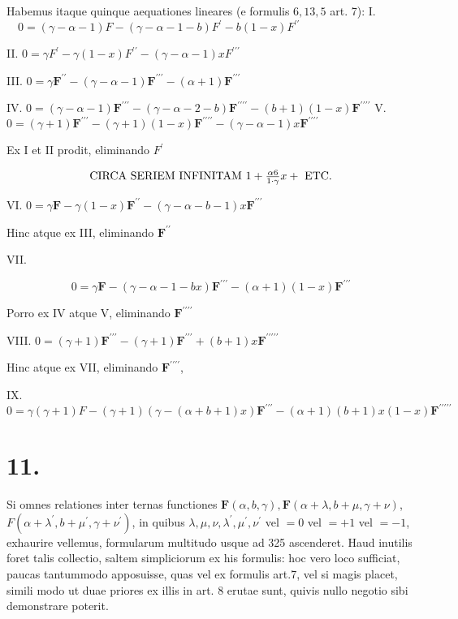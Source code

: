 \documentclass[twoside,12pt, showframe]{memoir}
\let\oldfrac\frac
\def\frac#1#2{\mathchoice{\tfrac{#1}{#2}}{\oldfrac{#1}{#2}}{\genfrac{}{}{}{2}{#1}{#2\mathstrut}}{\genfrac{}{}{}{3}{#1}{#2\mathstrut}}}
\begin{document}
Habemus itaque quinque aequationes lineares (e formulis \(6,13,5\) art. 7):
I. \(\quad 0=(\gamma-\alpha-1) F-(\gamma-\alpha-1-b) F^{\prime}-b(1-x) F^{\prime \prime}\)

II. \(0=\gamma F^{\prime}-\gamma(1-x) F^{\prime \prime}-(\gamma-\alpha-1) x F^{\prime \prime \prime}\)

III. \(0=\gamma \boldsymbol{F}^{\prime \prime}-(\gamma-\alpha-1) \boldsymbol{F}^{\prime \prime \prime}-(\alpha+1) \boldsymbol{F}^{\prime \prime \prime}\)

IV. \(0=(\gamma-\alpha-1) \boldsymbol{F}^{\prime \prime \prime}-(\gamma-\alpha-2-b) \boldsymbol{F}^{\prime \prime \prime \prime}-(b+1)(1-x) \boldsymbol{F}^{\prime \prime \prime \prime}\)
V. \(0=(\gamma+1) \boldsymbol{F}^{\prime \prime \prime}-(\gamma+1)(1-x) \boldsymbol{F}^{\prime \prime \prime \prime}-(\gamma-\alpha-1) x \boldsymbol{F}^{\prime \prime \prime \prime}\)

Ex I et II prodit, eliminando \(F^{\prime}\)

\[
\text { CIRCA SERIEM INFINITAM } 1+\frac{\alpha 6}{1 \cdot \gamma} x+\text { ETC. }
\]

VI. \(0=\gamma \boldsymbol{F}-\gamma(1-x) \boldsymbol{F}^{\prime \prime}-(\gamma-\alpha-b-1) x \boldsymbol{F}^{\prime \prime \prime}\)

Hinc atque ex III, eliminando \(\boldsymbol{F}^{\prime \prime}\)

VII.

\[
0=\gamma \boldsymbol{F}-(\gamma-\alpha-1-b x) \boldsymbol{F}^{\prime \prime \prime}-(\alpha+1)(1-x) \boldsymbol{F}^{\prime \prime \prime}
\]

Porro ex IV atque V, eliminando \(\boldsymbol{F}^{\prime \prime \prime \prime}\)

VIII. \(0=(\gamma+1) \boldsymbol{F}^{\prime \prime \prime}-(\gamma+1) \boldsymbol{F}^{\prime \prime \prime}+(b+1) x \boldsymbol{F}^{\prime \prime \prime \prime \prime}\)

Hinc atque ex VII, eliminando \(\boldsymbol{F}^{\prime \prime \prime \prime}\),

IX. \(0=\gamma(\gamma+1) F-(\gamma+1)(\gamma-(\alpha+b+1) x) \boldsymbol{F}^{\prime \prime \prime}-(\alpha+1)(b+1) x(1-x) \boldsymbol{F}^{\prime \prime \prime \prime \prime}\)

\section*{11.}
Si omnes relationes inter ternas functiones \(\boldsymbol{F}(\alpha, b, \gamma), \boldsymbol{F}(\alpha+\lambda, b+\mu, \gamma+\nu)\), \(F\left(\alpha+\lambda^{\prime}, b+\mu^{\prime}, \gamma+\nu^{\prime}\right)\), in quibus \(\lambda, \mu, \nu, \lambda^{\prime}, \mu^{\prime}, \nu^{\prime}\) vel \(=0\) vel \(=+1\) vel \(=-1\), exhaurire vellemus, formularum multitudo usque ad 325 ascenderet. Haud inutilis foret talis collectio, saltem simpliciorum ex his formulis: hoc vero loco sufficiat, paucas tantummodo apposuisse, quas vel ex formulis art.7, vel si magis placet, simili modo ut duae priores ex illis in art. 8 erutae sunt, quivis nullo negotio sibi demonstrare poterit.
\end{document}
